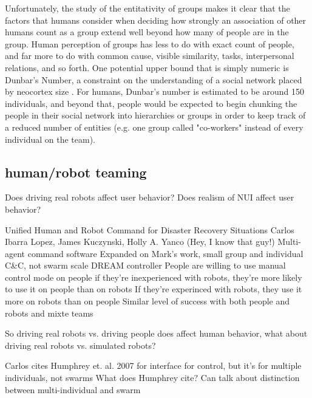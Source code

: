 Unfortunately, the study of the entitativity of groups makes it clear that the factors that humans consider when deciding how strongly an association of other humans count as a group extend well beyond how many of people are in the group.
Human perception of groups has less to do with exact count of people, and far more to do with common cause, visible similarity, tasks, interpersonal relations, and so forth. 
One potential upper bound that is simply numeric is Dunbar's Number, a constraint on the understanding of a social network placed by neocortex size \citep{dunbar1992neocortex}. 
For humans, Dunbar's number is estimated to be around 150 individuals, and beyond that, people would be expected to begin chunking the people in their social network into hierarchies or groups in order to keep track of a reduced number of entities (e.g. one group called "co-workers" instead of every individual on the team). 


\subsection{human/robot teaming}

Does driving real robots affect user behavior?
	Does realism of NUI affect user behavior?


Unified Human and Robot Command for Disaster Recovery Situations
Carlos Ibarra Lopez, James Kuczynski, Holly A. Yanco
	(Hey, I know that guy!)
	Multi-agent command software
		Expanded on Mark's work, small group and individual C\&C, not swarm scale
		DREAM controller
	People are willing to use manual control mode on people
		if they're inexperienced with robots, they're more likely to use it on people than on robots
		If they're experinced with robots, they use it more on robots than on people
	Similar level of success with both people and robots and mixte teams

So driving real robots vs. driving people does affect human behavior, what about driving real robots vs. simulated robots?


Carlos cites Humphrey et. al. 2007 for interface for control, but it's for multiple individuals, not swarms
	What does Humphrey cite? Can talk about distinction between multi-individual and swarm